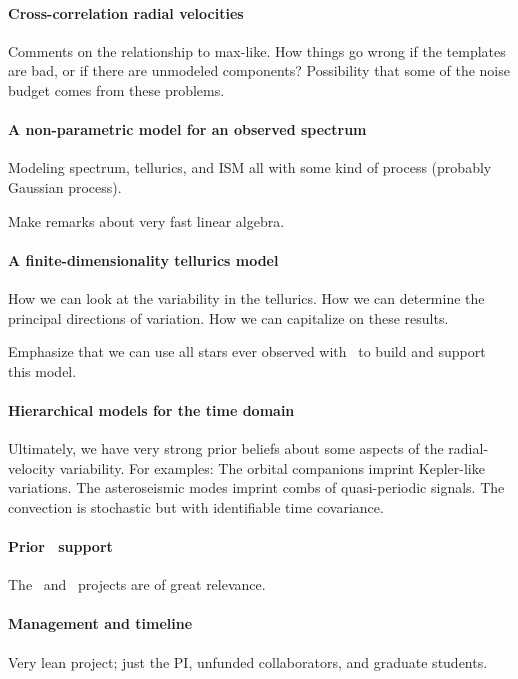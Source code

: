\documentclass[12pt, fullpage, letterpaper]{article}
\begin{document}
\paragraph{Cross-correlation radial velocities}
Comments on the relationship to max-like. How things go wrong
if the templates are bad, or if there are unmodeled components?
Possibility that some of the noise budget comes from these
problems.

\paragraph{A non-parametric model for an observed spectrum}
Modeling spectrum, tellurics, and ISM all with some kind of
process (probably Gaussian process).

Make remarks about very fast linear algebra.

\paragraph{A finite-dimensionality tellurics model}
How we can look at the variability in the tellurics.
How we can determine the principal directions of variation.
How we can capitalize on these results.

Emphasize that we can use all stars ever observed with \HARPS\ to
build and support this model.

\paragraph{Hierarchical models for the time domain}
Ultimately, we have very strong prior beliefs about some aspects
of the radial-velocity variability. For examples: The orbital
companions imprint Kepler-like variations. The asteroseismic modes
imprint combs of quasi-periodic signals. The convection is stochastic
but with identifiable time covariance.

\paragraph{Prior \NASA\ support}
The \GALEX\ and \Ktwo\ projects are of great relevance.

\paragraph{Management and timeline}
Very lean project; just the PI, unfunded collaborators, and graduate students.
\end{document}
